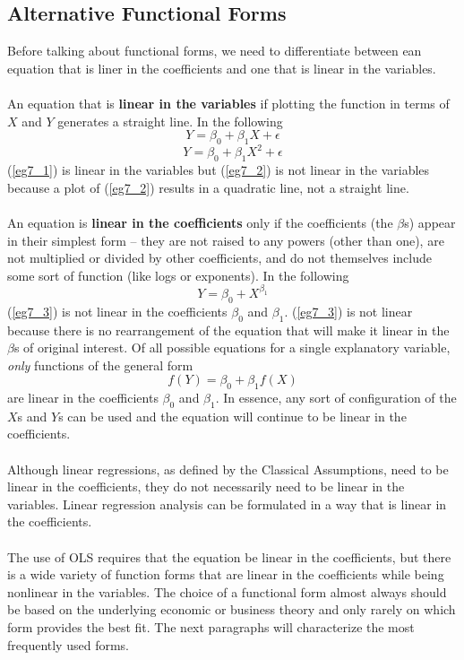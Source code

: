 \documentclass[11pt]{article}
\begin{document}
\subsection{Alternative Functional Forms}
Before talking about functional forms, we need to differentiate between ean equation that is liner in the coefficients and one that is linear in the variables.\\ \\
An equation that is \textbf{linear in the variables} if plotting the function in terms of $X$ and $Y$ generates a straight line. In the following
\begin{equation}
Y= \beta_0 + \beta_1X + \epsilon \label{eg7_1}
\end{equation}
\begin{equation}
Y= \beta_0 + \beta_1X^2 + \epsilon \label{eg7_2}
\end{equation}
(\ref{eg7_1}) is linear in the variables but (\ref{eg7_2}) is not linear in the variables because a plot of (\ref{eg7_2}) results in a quadratic line, not a straight line.\\ \\
An equation is \textbf{linear in the coefficients} only if the coefficients (the $\beta$s) appear in their simplest form -- they are not raised to any powers (other than one), are not multiplied or divided by other coefficients, and do not themselves include some sort of function (like logs or exponents). In the following
\begin{equation}
Y = \beta_0 + X^{\beta_1} \label{eg7_3}
\end{equation}
(\ref{eg7_3}) is not linear in the coefficients $\beta_0$ and $\beta_1$. (\ref{eg7_3}) is not linear because there is no rearrangement of the equation that will make it linear in the $\beta$s of original interest. Of all possible equations for a single explanatory variable, \textit{only} functions of the general form
\begin{equation}
f(Y) = \beta_0 + \beta_1f(X) \label{eg7_4}
\end{equation}
are linear in the coefficients $\beta_0$ and $\beta_1$. In essence, any sort of configuration of the $X$s and $Y$s can be used and the equation will continue to be linear in the coefficients. \\ \\
Although linear regressions, as defined by the Classical Assumptions, need to be linear in the coefficients, they do not necessarily need to be linear in the variables. Linear regression analysis can be formulated in a way that is linear in the coefficients.\\ \\
The use of OLS requires that the equation be linear in the coefficients, but there is a wide variety of function forms that are linear in the coefficients while being nonlinear in the variables. The choice of a functional form almost always should be based on the underlying economic or business theory and only rarely on which form provides the best fit. The next paragraphs will characterize the most frequently used forms. 
\end{document}
